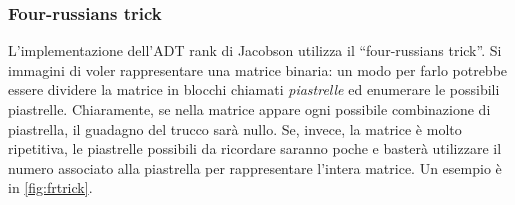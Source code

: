 \subsubsection{Four-russians trick}
L'implementazione dell'ADT rank di Jacobson
utilizza il ``four-russians trick''. Si immagini di
voler rappresentare una matrice binaria: un modo per farlo potrebbe essere
dividere la matrice in blocchi chiamati \textit{piastrelle} ed enumerare
le possibili piastrelle. Chiaramente, se nella matrice appare ogni possibile
combinazione di piastrella, il guadagno del trucco sarà nullo.
Se, invece, la matrice è molto ripetitiva, le piastrelle possibili da ricordare saranno
poche e basterà utilizzare il numero associato alla piastrella per rappresentare
l'intera matrice. Un esempio è in \cref{fig:frtrick}.

